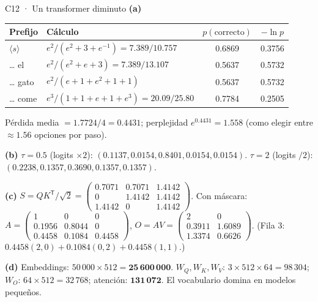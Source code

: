 \begin{solucion}{C12 · Un transformer diminuto}
\textbf{(a)}
\begin{center}\small
\begin{tabular}{l|l|c|c}
Prefijo & Cálculo & $p(\text{correcto})$ & $-\ln p$\\\hline
$\langle s\rangle$ & $e^2/(e^2+3+e^{-1})=7.389/10.757$ & 0.6869 & 0.3756\\
… el & $e^2/(e^2+e+3)=7.389/13.107$ & 0.5637 & 0.5732\\
… gato & $e^2/(e+1+e^2+1+1)$ & 0.5637 & 0.5732\\
… come & $e^3/(1+1+e+1+e^3)=20.09/25.80$ & 0.7784 & 0.2505
\end{tabular}
\end{center}
Pérdida media $=1.7724/4=\mathbf{0.4431}$; perplejidad $e^{0.4431}=\mathbf{1.558}$ (como elegir entre $\approx1.56$ opciones por paso).

\textbf{(b)} $\tau=0.5$ (logits $\times2$): $(0.1137,0.0154,\mathbf{0.8401},0.0154,0.0154)$. $\tau=2$ (logits $/2$): $(0.2238,0.1357,\mathbf{0.3690},0.1357,0.1357)$.

\textbf{(c)} $S=QK^\mathsf T/\sqrt2=\begin{pmatrix}0.7071&0.7071&1.4142\\0&1.4142&1.4142\\1.4142&0&1.4142\end{pmatrix}$. Con máscara:
$A=\begin{pmatrix}1&0&0\\0.1956&0.8044&0\\0.4458&0.1084&0.4458\end{pmatrix}$,
$O=AV=\begin{pmatrix}2&0\\0.3911&1.6089\\1.3374&0.6626\end{pmatrix}$.
(Fila 3: $0.4458(2,0)+0.1084(0,2)+0.4458(1,1)$.)

\textbf{(d)} Embeddings: $50\,000\times512=\mathbf{25\,600\,000}$. $W_Q,W_K,W_V$: $3\times512\times64=98\,304$; $W_O$: $64\times512=32\,768$; atención: $\mathbf{131\,072}$.
El vocabulario domina en modelos pequeños.
\end{solucion}


